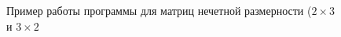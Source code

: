 \documentclass[a4paper,14pt]{article}
\begin{document}
            \begin{figure}[h!]
                \caption{Пример работы программы для матриц нечетной размерности ($2 \times 3$ и $3 \times 2$}
                \label{fig:image_test_3}
            \end{figure}
            
\end{document}
